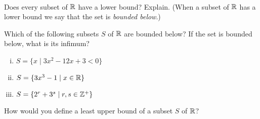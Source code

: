 \begin{pa} ~
\be
\item Does every subset of $\mathbb{R}$ have a lower bound? Explain. (When a subset of $\mathbb{R}$ has a lower bound we say that the set is \emph{bounded below}.)

\item Which of the following subsets $S$ of $\mathbb{R}$ are bounded below? If the set is bounded below, what is its infimum? 
	\begin{enumerate}[i.]
	\item $S = \{x \mid 3x^2-12x+3 < 0\}$

	\item $S = \{3x^3-1 \mid x \in \mathbb{R}\}$

	\item $S = \{2^r+3^s \mid r, s \in \mathbb{Z}^+\}$

	\end{enumerate}
	
\item How would you define a least upper bound of a subset $S$ of $\mathbb{R}$?

\ee


\end{pa}

